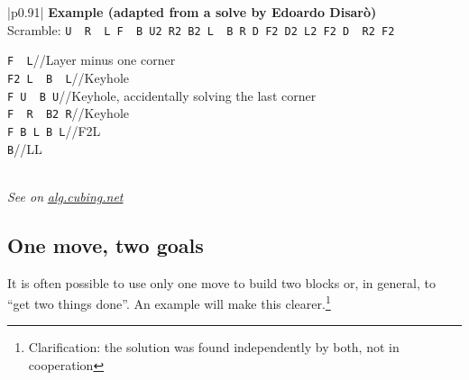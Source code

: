 \documentclass[11pt,a4paper]{book}
\newcommand{\p}{\textquotesingle}
\newcommand{\m}{\texttt}
\newcommand{\ps}{\p\,\,}
\newcommand{\comment}[1]{{\color{gray}\quad//#1}}
\begin{document}
\bigskip
\begin{tabular}{|p{}|}
\hline
\textbf{Example (adapted from a solve by Edoardo Disarò)}\\
\hline
Scramble: \m{U\ps R\ps L F\ps B U2 R2 B2 L\ps B R D F2 D2 L2 F2 D\ps R2 F2}\\
\hline
\begin{minipage}[l]{0.650\textwidth}
\m{F\ps L\p}\comment{Layer minus one corner}\\
\m{F2 L\ps B\ps L}\comment{Keyhole}\\
\m{F U\ps B U}\comment{Keyhole, accidentally solving the last corner}\\
\m{F\ps R\ps B2 R}\comment{Keyhole}\\
\m{F B L B L\p}\comment{F2L}\\
\m{B\p}\comment{LL}
\end{minipage}
\begin{minipage}[c]{0.25\textwidth}

\end{minipage}\\
\hline
\emph{See on }\href{https://alg.cubing.net/?setup=U-_R-_L_F-_B_U2_R2_B2_L-_B_R_D_F2_D2_L2_F2_D-_R2_F2&alg=F-_L-_\%2F\%2FLayer_minus_one_corner\%0AF2_L-_B-_L_\%2F\%2FKeyhole\%0AF_U-_B_U_\%2F\%2FKeyhole,_accidentally_solving_the_last_corner\%0AF-_R-_B2_R_\%2F\%2FKeyhole\%0AF_B_L_B_L-_\%2F\%2FF2L\%0AB-_\%2F\%2FLL}{\emph{alg.cubing.net}}\\
\hline
\end{tabular}
\bigskip

\subsection{One move, two goals}

It is often possible to use only one move to build two blocks or, in general, to ``get two things done''. An example will make this clearer.\footnote{Clarification: the solution was found independently by both, not in cooperation}
\end{document}

